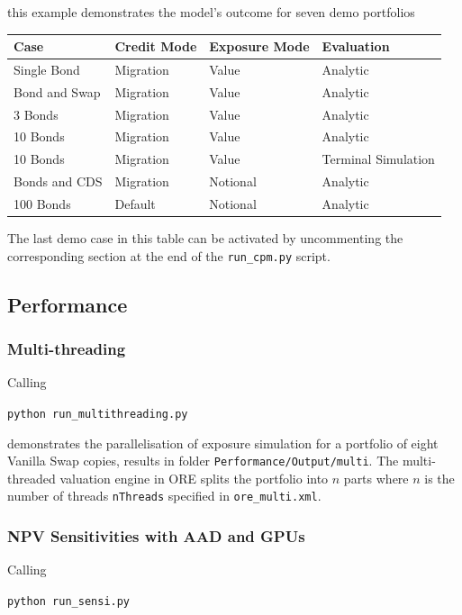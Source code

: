 \medskip
this example demonstrates the model's outcome for seven demo portfolios

\begin{center}
\begin{tabular}{|l|l|l|l|}
\hline
Case & Credit Mode & Exposure Mode & Evaluation \\
\hline
\hline
Single Bond & Migration & Value & Analytic \\
\hline
Bond and Swap & Migration & Value & Analytic \\
\hline
3 Bonds & Migration & Value & Analytic \\
\hline
10 Bonds & Migration & Value & Analytic \\
\hline
10 Bonds & Migration & Value & Terminal Simulation \\
\hline
Bonds and CDS & Migration & Notional & Analytic \\
\hline
100 Bonds & Default & Notional & Analytic \\
\hline
\end{tabular}
\end{center}
The last demo case in this table can be activated by uncommenting the corresponding section at the end of the {\tt run\_cpm.py}
script.

\subsection{Performance}\label{example:performance}

\subsubsection{Multi-threading}

Calling
\medskip
\centerline {\tt python run\_multithreading.py}

\medskip
demonstrates the parallelisation of exposure simulation for a portfolio of eight Vanilla Swap copies, results in folder
{\tt Performance/Output/multi}. The multi-threaded valuation engine in ORE splits the portfolio into $n$ parts where
$n$ is the number of threads {\tt nThreads} specified in {\tt ore\_multi.xml}.

\subsubsection{NPV Sensitivities with AAD and GPUs}

Calling
\medskip
\centerline {\tt python run\_sensi.py}

